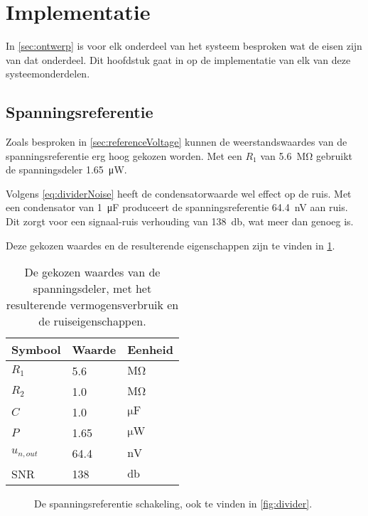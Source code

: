 \section{Implementatie}
In \cref{sec:ontwerp} is voor elk onderdeel van het systeem besproken wat de eisen zijn van dat onderdeel. Dit hoofdstuk gaat in op de implementatie van elk van deze systeemonderdelen.

\subsection{Spanningsreferentie}
Zoals besproken in \cref{sec:referenceVoltage} kunnen de weerstandswaardes van de spanningsreferentie erg hoog gekozen worden. Met een $R_1$ van \qty{5.6}{\mega\ohm} gebruikt de spanningsdeler \qty{1.65}{\micro\watt}.

Volgens \cref{eq:dividerNoise} heeft de condensatorwaarde wel effect op de ruis. Met een condensator van \qty{1}{\micro\farad} produceert de spanningsreferentie \qty{64.4}{\nano\volt} aan ruis. Dit zorgt voor een signaal-ruis verhouding van \qty{138}{\decibel}, wat meer dan genoeg is.

Deze gekozen waardes en de resulterende eigenschappen zijn te vinden in \cref{tab:divider}.

\begin{table}[!htbp]
    \centering
    \begin{tabular}{l|l|l}
        Symbool & Waarde & Eenheid \\
        \hline
        $R_1$       & 5.6  & $\si{\mega\ohm}$   \\
        $R_2$       & 1.0  & $\si{\mega\ohm}$   \\
        $C$         & 1.0  & $\si{\micro\farad}$\\
        $P$         & 1.65 & $\si{\micro\watt}$ \\
        $u_{n,out}$ & 64.4 & $\si{\nano\volt}$  \\
        SNR         & 138  & $\si{\decibel}$
    \end{tabular}
    \caption{De gekozen waardes van de spanningsdeler, met het resulterende vermogensverbruik en de ruiseigenschappen.}
    \label{tab:divider}
\end{table}

\begin{figure}[!htbp]
    \centering
    \def\svgwidth{7cm}
    
    \caption{De spanningsreferentie schakeling, ook te vinden in \cref{fig:divider}.}
    \label{fig:dividerForContext}
\end{figure}

